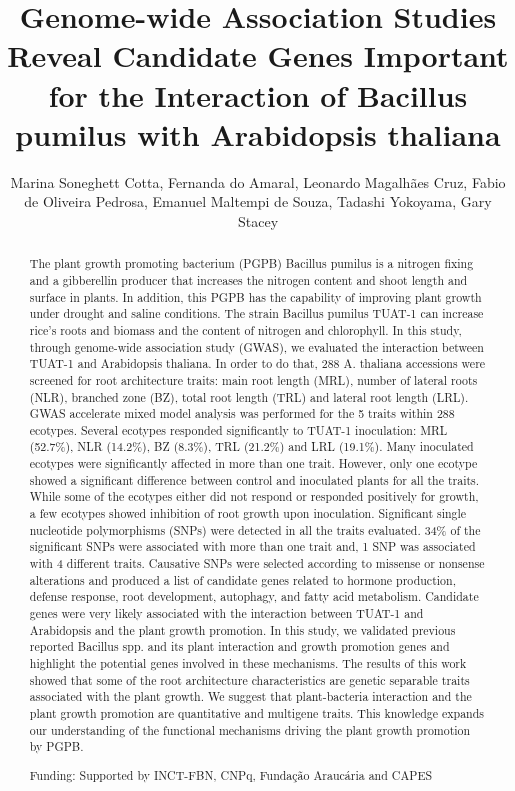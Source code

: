 \documentclass[twoside]{article}
\title{\vspace{-15mm}\fontsize{24pt}{10pt}\selectfont\textbf{ Genome-wide Association Studies Reveal Candidate Genes Important for the Interaction of Bacillus pumilus with Arabidopsis thaliana }} %
\author{ Marina Soneghett Cotta, Fernanda do Amaral, Leonardo Magalh\~aes Cruz, Fabio de Oliveira Pedrosa, Emanuel Maltempi de Souza, Tadashi Yokoyama, Gary Stacey }
\affil{ University of Missouri }
\date{}
\begin{document}
  
  
  \maketitle %
  
  
  \thispagestyle{fancy} %
  
  
  \begin{abstract}
  The plant growth promoting bacterium (PGPB) Bacillus pumilus is a nitrogen fixing and a gibberellin producer that increases the nitrogen content and shoot length and surface in plants. In addition,  this PGPB has the capability of improving plant growth under drought and saline conditions. The strain Bacillus pumilus TUAT-1 can increase rice’s roots and biomass and the content of nitrogen and chlorophyll. In this study,  through genome-wide association study (GWAS),  we evaluated the interaction between TUAT-1 and Arabidopsis thaliana. In order to do that,  288 A. thaliana accessions were screened for root architecture traits: main root length (MRL),  number of lateral roots (NLR),  branched zone (BZ),  total root length (TRL) and lateral root length (LRL). GWAS accelerate mixed model analysis was performed for the 5 traits within 288 ecotypes. Several ecotypes responded significantly to TUAT-1 inoculation: MRL (52.7\%),  NLR (14.2\%),  BZ (8.3\%),  TRL (21.2\%) and LRL (19.1\%). Many inoculated ecotypes were significantly affected in more than one trait. However,  only one ecotype showed a significant difference between control and inoculated plants for all the traits. While some of the ecotypes either did not respond or responded positively for growth,  a few ecotypes showed inhibition of root growth upon inoculation. Significant single nucleotide polymorphisms (SNPs) were detected in all the traits evaluated. 34\% of the significant SNPs were associated with more than one trait and,  1 SNP was associated with 4 different traits. Causative SNPs were selected according to missense or nonsense alterations and produced a list of candidate genes related to hormone production,  defense response,  root development,  autophagy,  and fatty acid metabolism. Candidate genes were very likely associated with the interaction between TUAT-1 and Arabidopsis and the plant growth promotion. In this study,  we validated previous reported Bacillus spp. and its plant interaction and growth promotion genes and highlight the potential genes involved in these mechanisms. The results of this work showed that some of the root architecture characteristics are genetic separable traits associated with the plant growth. We suggest that plant-bacteria interaction and the plant growth promotion are quantitative and multigene traits. This knowledge expands our understanding of the functional mechanisms driving the plant growth promotion by PGPB.
  
  Funding: Supported by INCT-FBN,  CNPq,  Funda\c{c}\~ao Arauc\'aria and CAPES \\ 
  \end{abstract}
  
\end{document}
